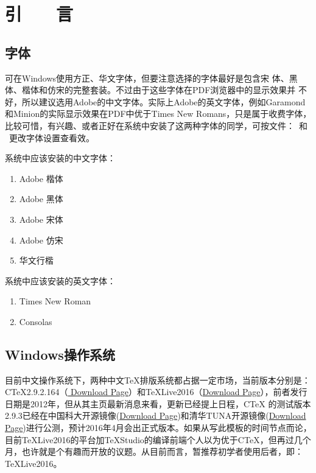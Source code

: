 \chapter*{\hfill 引　　言 \hfill}
\label{chap00}

\section{字体}

可在Windows使用方正、华文字体，但要注意选择的字体最好是包含宋
体、黑体、楷体和仿宋的完整套装。不过由于这些字体在PDF浏览器中的显示效果并
不好，所以建议选用Adobe的中文字体。实际上Adobe的英文字体，例如Garamond和Minion的实际显示效果在PDF中优于Times New Romans，只是属于收费字体，比较可惜，有兴趣、或者正好在系统中安装了这两种字体的同学，可按文件：~和
~更改字体设置查看效。

系统中应该安装的中文字体：
\begin{enumerate}
\item Adobe 楷体
\item Adobe 黑体
\item Adobe 宋体
\item Adobe 仿宋
\item 华文行楷
\end{enumerate}

系统中应该安装的英文字体：
\begin{enumerate}
\item Times New Roman
\item Consolas
\end{enumerate}

\section{Windows操作系统}

目前中文操作系统下，两种中文\TeX 排版系统都占据一定市场，当前版本分别是：C\TeX 2.9.2.164（\href{http://www.ctex.org/CTeXDownload}{
	Download Page}）和\TeX Live2016（\href{http://www.chinatex.org/?p=1323}{Download Page}），前者发行日期是2012年，但从其主页最新消息来看，更新已经提上日程，C\TeX{} 的测试版本2.9.3已经在中国科大开源镜像(\href{http://mirrors.ustc.edu.cn/ctex/unstable/}{Download Page})和清华TUNA开源镜像(\href{https://mirrors.tuna.tsinghua.edu.cn/ctex/unstable/}{Download Page})进行公测，预计2016年4月会出正式版本。如果从写此模板的时间节点而论，目前\TeX{}Live2016的平台加\TeX{}Studio的编译前端个人以为优于C\TeX{}，但再过几个月，也许就是个有趣而开放的议题。从目前而言，暂推荐初学者使用后者，即：\TeX{}Live2016。

